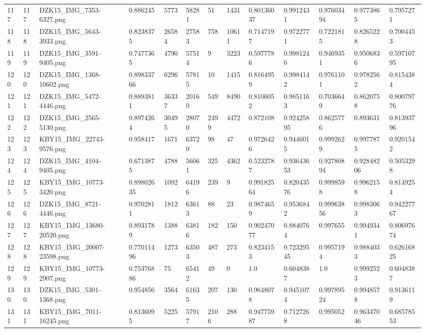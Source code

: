 \documentclass[11pt, a4paper, twoside]{report}
\begin{document}
\begin{longtable}[c]{@{}lllllllllllll@{}}
117 & 117 & DZK15\_IMG\_7353-6327.png & 0.886245 & 5773 & 58281 & 51 & 1431 & 0.80136037 & 0.9912431 & 0.97603494 & 0.9773865 & 0.7957271 \\
118 & 118 & DZK15\_IMG\_5643-3933.png & 0.8238375 & 26584 & 27583 & 758 & 10611 & 0.7147197 & 0.9722771 & 0.7221815 & 0.8265228 & 0.7004453 \\
119 & 119 & DZK15\_IMG\_3591-9405.png & 0.7477365 & 4790 & 57514 & 9 & 3223 & 0.5977786 & 0.9981246 & 0.9469351 & 0.9506836 & 0.59710795 \\
120 & 120 & DZK15\_IMG\_1368-10602.png & 0.89833766 & 6296 & 57815 & 10 & 1415 & 0.8164959 & 0.9984142 & 0.9761101 & 0.9782562 & 0.8154384 \\
121 & 121 & DZK15\_IMG\_5472-4446.png & 0.8893811 & 36337 & 20160 & 549 & 8490 & 0.8106052 & 0.9851163 & 0.7036649 & 0.8620758 & 0.80079776 \\
122 & 122 & DZK15\_IMG\_2565-5130.png & 0.8974264 & 30495 & 28070 & 2499 & 4472 & 0.872108 & 0.92425895 & 0.8625776 & 0.893631 & 0.81393796 \\
123 & 123 & KBY15\_IMG\_22743-9576.png & 0.958417 & 1671 & 63720 & 98 & 47 & 0.9726426 & 0.9446015 & 0.9992629 & 0.9977875 & 0.9201542 \\
124 & 124 & DZK15\_IMG\_4104-9405.png & 0.6713875 & 4788 & 56061 & 325 & 4362 & 0.5232787 & 0.93643653 & 0.92780894 & 0.92848206 & 0.5053298 \\
125 & 125 & KBY15\_IMG\_10773-3420.png & 0.89802635 & 1092 & 64196 & 239 & 9 & 0.99182564 & 0.82043576 & 0.9998598 & 0.9962158 & 0.8149254 \\
126 & 126 & DZK15\_IMG\_8721-4446.png & 0.9702811 & 1812 & 63613 & 88 & 23 & 0.9874659 & 0.9536842 & 0.99963856 & 0.9983063 & 0.94227767 \\
127 & 127 & KBY15\_IMG\_13680-20520.png & 0.8931789 & 1388 & 63816 & 182 & 150 & 0.90247077 & 0.8840764 & 0.997655 & 0.9949341 & 0.80697674 \\
128 & 128 & KBY15\_IMG\_20007-23598.png & 0.77011496 & 1273 & 63503 & 487 & 273 & 0.8234153 & 0.72329545 & 0.9957194 & 0.9884033 & 0.62616825 \\
129 & 129 & KBY15\_IMG\_10773-2907.png & 0.75376886 & 75 & 65412 & 49 & 0 & 1.0 & 0.6048387 & 1.0 & 0.9992523 & 0.6048387 \\
130 & 130 & DZK15\_IMG\_5301-1368.png & 0.954856 & 3564 & 61635 & 207 & 130 & 0.9648078 & 0.9451074 & 0.99789524 & 0.9948578 & 0.9136119 \\
131 & 131 & KBY15\_IMG\_7011-16245.png & 0.8136095 & 5225 & 57917 & 2106 & 288 & 0.94775987 & 0.7127268 & 0.995052 & 0.96347046 & 0.68578553 \\

\end{longtable}
\end{document}
